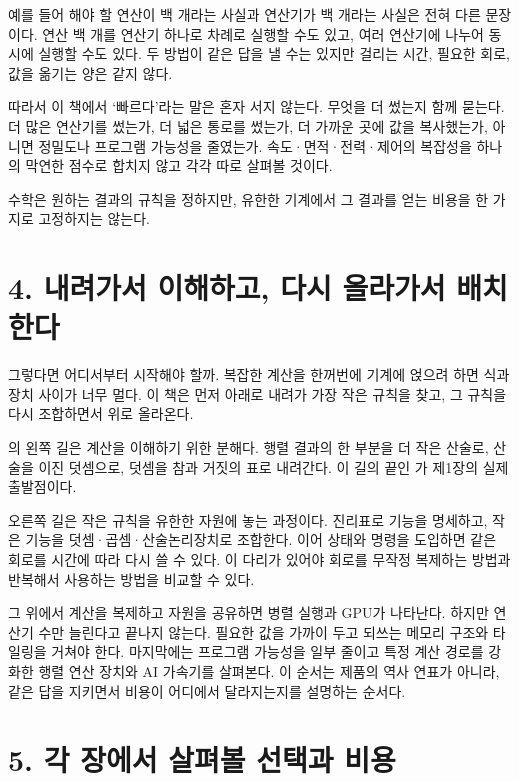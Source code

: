 예를 들어 해야 할 연산이 백 개라는 사실과 연산기가 백 개라는 사실은 전혀 다른 문장이다. 연산 백 개를 연산기 하나로 차례로 실행할 수도 있고, 여러 연산기에 나누어 동시에 실행할 수도 있다. 두 방법이 같은 답을 낼 수는 있지만 걸리는 시간, 필요한 회로, 값을 옮기는 양은 같지 않다.

따라서 이 책에서 `빠르다'라는 말은 혼자 서지 않는다. 무엇을 더 썼는지 함께 묻는다. 더 많은 연산기를 썼는가, 더 넓은 통로를 썼는가, 더 가까운 곳에 값을 복사했는가, 아니면 정밀도나 프로그램 가능성을 줄였는가. 속도·면적·전력·제어의 복잡성을 하나의 막연한 점수로 합치지 않고 각각 따로 살펴볼 것이다.

\begin{shadequote}
수학은 원하는 결과의 규칙을 정하지만, 유한한 기계에서 그 결과를 얻는 비용을 한 가지로 고정하지는 않는다.
\end{shadequote}

\section*{4. 내려가서 이해하고, 다시 올라가서 배치한다}

그렇다면 어디서부터 시작해야 할까. 복잡한 계산을 한꺼번에 기계에 얹으려 하면 식과 장치 사이가 너무 멀다. 이 책은 먼저 아래로 내려가 가장 작은 규칙을 찾고, 그 규칙을 다시 조합하면서 위로 올라온다.



의 왼쪽 길은 계산을 이해하기 위한 분해다. 행렬 결과의 한 부분을 더 작은 산술로, 산술을 이진 덧셈으로, 덧셈을 참과 거짓의 표로 내려간다. 이 길의 끝인 가 제1장의 실제 출발점이다.

오른쪽 길은 작은 규칙을 유한한 자원에 놓는 과정이다. 진리표로 기능을 명세하고, 작은 기능을 덧셈·곱셈·산술논리장치로 조합한다. 이어 상태와 명령을 도입하면 같은 회로를 시간에 따라 다시 쓸 수 있다. 이 다리가 있어야 회로를 무작정 복제하는 방법과 반복해서 사용하는 방법을 비교할 수 있다.

그 위에서 계산을 복제하고 자원을 공유하면 병렬 실행과 GPU가 나타난다. 하지만 연산기 수만 늘린다고 끝나지 않는다. 필요한 값을 가까이 두고 되쓰는 메모리 구조와 타일링을 거쳐야 한다. 마지막에는 프로그램 가능성을 일부 줄이고 특정 계산 경로를 강화한 행렬 연산 장치와 AI 가속기를 살펴본다. 이 순서는 제품의 역사 연표가 아니라, 같은 답을 지키면서 비용이 어디에서 달라지는지를 설명하는 순서다.

\section*{5. 각 장에서 살펴볼 선택과 비용}

